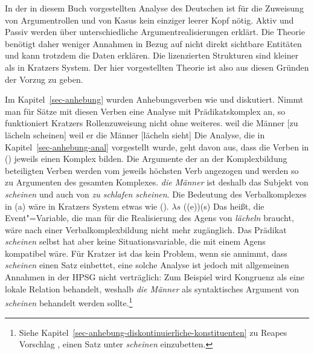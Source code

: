 {In der in diesem Buch vorgestellten Analyse des Deutschen ist für die Zuweisung
von Argumentrollen und von Kasus kein einziger leerer Kopf nötig. Aktiv und Passiv
werden über unterschiedliche Argumentrealisierungen erklärt. Die Theorie benötigt
daher weniger Annahmen in Bezug auf nicht direkt sichtbare Entitäten und kann trotzdem
die Daten erklären. Die lizenzierten Strukturen sind kleiner als in Kratzers System.
Der hier vorgestellten Theorie ist also aus diesen Gründen der Vorzug zu geben.%


Im Kapitel~\ref{sec-anhebung} wurden Anhebungsverben wie  und  diskutiert.
Nimmt man für Sätze mit diesen Verben eine Analyse mit Prädikatskomplex an, so funktioniert Kratzers
Rollenzuweisung nicht ohne weiteres.
\eal
\ex weil die Männer [zu lächeln scheinen]
\ex weil er die Männer [lächeln sieht]
\zl
Die Analyse, die in Kapitel~\ref{sec-anhebung-anal} vorgestellt wurde, geht davon aus, dass die Verben
in () jeweils einen Komplex bilden. Die Argumente der an der Komplexbildung beteiligten Verben
werden vom jeweils höchsten Verb angezogen und werden so zu Argumenten des gesamten Komplexes.
\emph{die Männer} ist deshalb das Subjekt von \emph{scheinen} und auch von \emph{zu schlafen scheinen}. Die
Bedeutung des Verbalkomplexes in (a) wäre in Kratzers System etwas wie ().
\ea
$\lambda s$ ((e))(s)
\z
Das heißt, die Event"=Variable, die man für die Realisierung des Agens von \emph{lächeln} braucht, wäre
nach einer Verbalkomplexbildung nicht mehr zugänglich. Das Prädikat \emph{scheinen} selbst
hat aber keine Situationsvariable, die mit einem Agens kompatibel wäre.
Für Kratzer ist das kein Problem, wenn sie annimmt, dass \emph{scheinen} einen Satz einbettet, 
eine solche Analyse ist jedoch mit allgemeinen Annahmen in der HPSG nicht verträglich: 
Zum Beispiel wird Kongruenz als eine lokale Relation behandelt, weshalb
\emph{die Männer} als syntaktisches Argument von \emph{scheinen} behandelt werden sollte.\footnote{
  Siehe Kapitel~\ref{sec-anhebung-diskontinuierliche-konstituenten}
zu Reapes Vorschlag \citeyearpar{Reape94a},
  einen Satz unter \emph{scheinen} einzubetten.%
}

}

